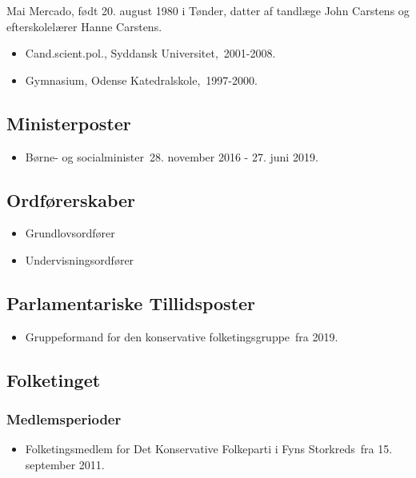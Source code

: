 \documentclass[11pt, a4paper]{awesome-cv}
\begin{document}
\makecvheader[R]
\makelettertitle
\begin{cvletter}
Mai Mercado, født 20. august 1980 i Tønder, datter af tandlæge John Carstens og efterskolelærer Hanne Carstens.

\begin{itemize}
\item Cand.scient.pol., Syddansk Universitet, 2001-2008.
\item Gymnasium, Odense Katedralskole, 1997-2000.
\end{itemize}
\subsection*{Ministerposter}
\begin{itemize}
\item Børne- og socialminister 28. november 2016 - 27. juni 2019.
\end{itemize}
\subsection*{Ordførerskaber}
\begin{itemize}
\item Grundlovsordfører
\item Undervisningsordfører
\end{itemize}
\subsection*{Parlamentariske Tillidsposter}
\begin{itemize}
\item Gruppeformand for den konservative folketingsgruppe fra 2019.
\end{itemize}
\subsection*{Folketinget}
\subsubsection*{Medlemsperioder}
\begin{itemize}
\item Folketingsmedlem for Det Konservative Folkeparti i Fyns Storkreds fra 15. september 2011.
\end{itemize}

\end{cvletter}
\end{document}

